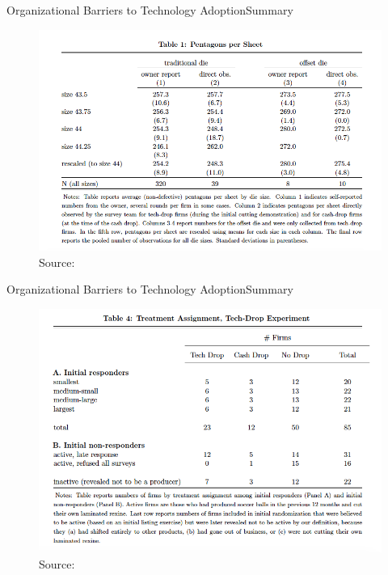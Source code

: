\documentclass{beamer}
\begin{document}
\begin{frame}{Organizational Barriers to Technology Adoption}{Summary}
\begin{figure}[h]
\begin{centering}
  \includegraphics[width=\textwidth]{atkin3}
  \caption{Source: \cite{Atkin2015}}
   \label{fig:atkin3}
\end{centering}
\end{figure}
\end{frame}

\begin{frame}{Organizational Barriers to Technology Adoption}{Summary}
\begin{figure}[h]
\begin{centering}
  \includegraphics[width=\textwidth]{atkin4}
  \caption{Source: \cite{Atkin2015}}
   \label{fig:atkin4}
\end{centering}
\end{figure}
\end{frame}
\end{document}
